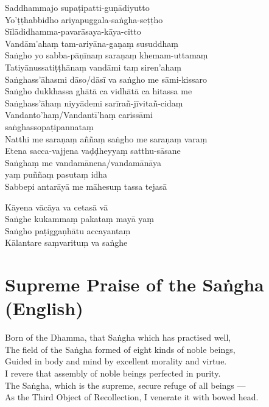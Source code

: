Saddhammajo supaṭipatti-guṇādiyutto\\
Yo'ṭṭhabbidho ariyapuggala-saṅgha-seṭṭho\\
Sīlādidhamma-pavarāsaya-kāya-citto\\
Vandām'ahaṃ tam-ariyāna-gaṇaṃ susuddhaṃ\\
Saṅgho yo sabba-pāṇīnaṃ saraṇaṃ khemam-uttamaṃ\\
Tatiyānussatiṭṭhānaṃ vandāmi taṃ siren'ahaṃ\\
Saṅghass'āhasmi dāso/dāsī va saṅgho me sāmi-kissaro\\
Saṅgho dukkhassa ghātā ca vidhātā ca hitassa me\\
Saṅghass'āhaṃ niyyādemi sarīrañ-jīvitañ-cidaṃ\\
Vandanto'haṃ/Vandantī'haṃ carissāmi\\
\vin saṅghassopaṭipannataṃ\\
Natthi me saraṇaṃ aññaṃ saṅgho me saraṇaṃ varaṃ\\
Etena sacca-vajjena vaḍḍheyyaṃ satthu-sāsane\\
Saṅghaṃ me vandamānena/vandamānāya\\
\vin yaṃ puññaṃ pasutaṃ idha\\
Sabbepi antarāyā me māhesuṃ tassa tejasā


Kāyena vācāya va cetasā vā\\
Saṅghe kukammaṃ pakataṃ mayā yaṃ\\
Saṅgho paṭiggaṇhātu accayantaṃ\\
Kālantare saṃvarituṃ va saṅghe

\section*{Supreme Praise of the Saṅgha (English)}

\begin{leader}
\end{leader}

Born of the Dhamma, that Saṅgha which has practised well,\\
The field of the Saṅgha formed of eight kinds of noble beings,\\
Guided in body and mind by excellent morality and virtue.\\
I revere that assembly of noble beings perfected in purity.\\
The Saṅgha, which is the supreme, secure refuge of all beings ---\\
As the Third Object of Recollection, I venerate it with bowed head.

